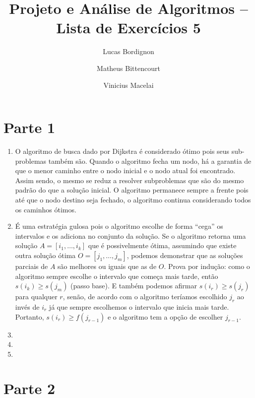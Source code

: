\documentclass{article}
\title{Projeto e Análise de Algoritmos -- Lista de Exercícios 5}
\author{Lucas Bordignon \and Matheus Bittencourt \and Vinicius Macelai}
\date{}
\begin{document}
\maketitle

\section*{Parte 1}

\begin{enumerate}

	\item O algoritmo de busca dado por Dijkstra é considerado ótimo pois seus
	sub-problemas também são. Quando o algoritmo fecha um nodo, há a garantia
	de que o menor caminho entre o nodo inicial e o nodo atual foi encontrado.
	Assim sendo, o mesmo se reduz a resolver subproblemas que são do mesmo
	padrão do que a solução inicial. O algoritmo permanece sempre a frente pois
	até que o nodo destino seja fechado, o algoritmo continua considerando
	todos os caminhos ótimos.

	\item É uma estratégia gulosa pois o algoritmo escolhe de forma ``cega'' os
	intervalos e os adiciona no conjunto da solução.  Se o algoritmo retorna
	uma solução $A = [i_1, \ldots, i_k]$ que é possivelmente ótima, assumindo
	que existe outra solução ótima $O = [j_1, \ldots, j_m]$, podemos demonstrar
	que as soluções parciais de $A$ são melhores ou iguais que as de $O$. Prova
	por indução: como o algoritmo sempre escolhe o intervalo que começa mais
	tarde, então $s(i_k) \ge s(j_m)$ (passo base). E também podemos afirmar
	$s(i_r) \ge s(j_r)$ para qualquer $r$, senão, de acordo com o algoritmo
	teríamos escolhido $j_r$ ao invés de $i_r$ já que sempre escolhemos o
	intervalo que inicia mais tarde. Portanto, $s(i_r) \ge f(j_{r-1})$ e o
	algoritmo tem a opção de escolher $j_{r-1}$.

	\item

	\item

	\item

\end{enumerate}

\section*{Parte 2}
\end{document}
